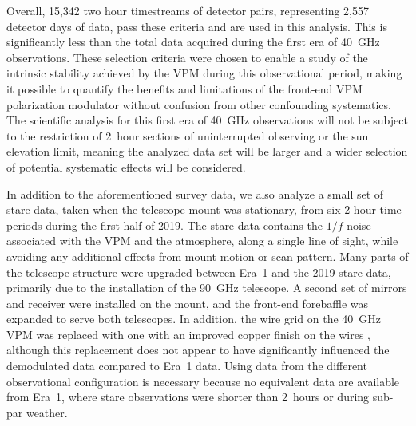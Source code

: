 \documentclass[twocolumn, tighten, numberedappendix, twocolappendix]{aastex63}
\newcommand{\nTotalTimestreams}{15,342 }
\newcommand{\nTotalDetdays}{2,557 }
\begin{document}
Overall, \nTotalTimestreams two hour timestreams of detector pairs, representing \nTotalDetdays detector days of data, pass these criteria and are used in this analysis. This is significantly less than the total data acquired during the first era of 40~GHz observations. These selection criteria were chosen to enable a study of the intrinsic stability achieved by the VPM during this observational period, making it possible to quantify the benefits and limitations of the front-end VPM polarization modulator without confusion from other confounding systematics. The scientific analysis for this first era of 40~GHz observations will not be subject to the restriction of 2~hour sections of uninterrupted observing or the sun elevation limit, meaning the analyzed data set will be larger and a wider selection of potential systematic effects will be considered.

In addition to the aforementioned survey data, we also analyze a small set of stare data, taken when the telescope mount was stationary, from six 2-hour time periods during the first half of 2019. The stare data contains the $1/f$ noise associated with the VPM and the atmosphere, along a single line of sight, while avoiding any additional effects from mount motion or scan pattern. Many parts of the telescope structure were upgraded between Era~1 and the 2019 stare data, primarily due to the installation of the 90~GHz telescope. A second set of mirrors and receiver were installed on the mount, and the front-end forebaffle was expanded to serve both telescopes. In addition, the wire grid on the 40~GHz VPM was replaced with one with an improved copper finish on the wires \citep{harr18}, although this replacement does not appear to have significantly influenced the demodulated data compared to Era~1 data. Using data from the different observational configuration is necessary because no equivalent data are available from Era~1, where stare observations were shorter than 2~hours or during sub-par weather. 
\end{document}
